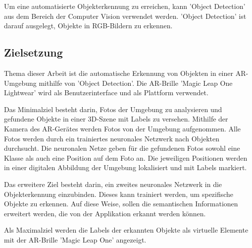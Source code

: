 Um eine automatisierte Objekterkennung zu erreichen, kann 'Object Detection' aus dem Bereich der Computer Vision verwendet werden.
'Object Detection' ist darauf ausgelegt, Objekte in RGB-Bildern zu erkennen.\citep{introToCNN}
\subsection{Zielsetzung}

Thema dieser Arbeit ist die automatische Erkennung von Objekten in einer AR-Umgebung mithilfe von 'Object Detection'. 
Die AR-Brille 'Magic Leap One Lightwear' wird als Benutzerinterface und als Plattform verwendet.

Das Minimalziel besteht darin, Fotos der Umgebung zu analysieren und gefundene Objekte in einer 3D-Szene mit Labels zu versehen. 
Mithilfe der Kamera des AR-Gerätes werden Fotos von der Umgebung aufgenommen. Alle Fotos werden durch ein trainiertes neuronales Netzwerk nach Objekten durchsucht. Die neuronalen Netze geben für die gefundenen Fotos sowohl eine Klasse als auch eine Position auf dem Foto an. Die jeweiligen Positionen werden in einer digitalen Abbildung der Umgebung lokalisiert und mit Labels markiert.

Das erweitere Ziel besteht darin, ein zweites neuronales Netzwerk in die Objekterkennung einzubinden. Dieses kann trainiert werden, um spezifische Objekte zu erkennen. Auf diese Weise, sollen die semantischen Informationen erweitert werden, die von der Applikation erkannt werden können.

Als Maximalziel werden die Labels der erkannten Objekte als virtuelle Elemente mit der AR-Brille 'Magic Leap One' angezeigt.
%
%


